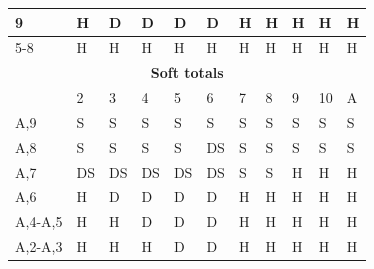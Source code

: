 \documentclass[conference]{IEEEtran}
\begin{document}
\begin{table}[ht]
\begin{tabular}{|l|l|l|l|l|l|l|l|l|l|l|}
9                            & \cellcolor{green!50}H & \cellcolor{blue!25}D & \cellcolor{blue!25}D & \cellcolor{blue!25}D & \cellcolor{blue!25}D & \cellcolor{green!50}H & \cellcolor{green!50}H & \cellcolor{green!50}H & \cellcolor{green!50}H & \cellcolor{green!50}H  \\ \hline
5-8                          & \cellcolor{green!50}H & \cellcolor{green!50}H & \cellcolor{green!50}H & \cellcolor{green!50}H & \cellcolor{green!50}H & \cellcolor{green!50}H & \cellcolor{green!50}H & \cellcolor{green!50}H & \cellcolor{green!50}H & \cellcolor{green!50}H \\ \hline \hline

\multicolumn{11}{|c|}{\textbf{Soft totals}}                           \\ \hline
                             & 2 & 3 & 4 & 5 & 6 & 7 & 8 & 9 & 10 & A \\ \hline
A,9                      & \cellcolor{red!75}S & \cellcolor{red!75}S & \cellcolor{red!75}S & \cellcolor{red!75}S & \cellcolor{red!75}S & \cellcolor{red!75}S & \cellcolor{red!75}S & \cellcolor{red!75}S & \cellcolor{red!75}S & \cellcolor{red!75}S  \\ \hline
A,8                    & \cellcolor{red!75}S & \cellcolor{red!75}S & \cellcolor{red!75}S & \cellcolor{red!75}S & \cellcolor{blue!25}DS & \cellcolor{red!75}S & \cellcolor{red!75}S & \cellcolor{red!75}S & \cellcolor{red!75}S & \cellcolor{red!75}S  \\ \hline
A,7                          & \cellcolor{blue!25}DS & \cellcolor{blue!25}DS & \cellcolor{blue!25}DS & \cellcolor{blue!25}DS & \cellcolor{blue!25}DS & \cellcolor{red!75}S & \cellcolor{red!75}S & \cellcolor{green!50}H & \cellcolor{green!50}H & \cellcolor{green!50}H  \\ \hline
A,6                          & \cellcolor{green!50}H & \cellcolor{blue!25}D & \cellcolor{blue!25}D & \cellcolor{blue!25}D & \cellcolor{blue!25}D & \cellcolor{green!50}H & \cellcolor{green!50}H & \cellcolor{green!50}H & \cellcolor{green!50}H & \cellcolor{green!50}H  \\ \hline
A,4-A,5                      & \cellcolor{green!50}H & \cellcolor{green!50}H & \cellcolor{blue!25}D & \cellcolor{blue!25}D & \cellcolor{blue!25}D & \cellcolor{green!50}H & \cellcolor{green!50}H & \cellcolor{green!50}H & \cellcolor{green!50}H & \cellcolor{green!50}H  \\ \hline
A,2-A,3                      & \cellcolor{green!50}H & \cellcolor{green!50}H & \cellcolor{green!50}H & \cellcolor{blue!25}D & \cellcolor{blue!25}D & \cellcolor{green!50}H & \cellcolor{green!50}H & \cellcolor{green!50}H & \cellcolor{green!50}H & \cellcolor{green!50}H  \\ \hline \hline


\end{tabular}
\end{table}
\end{document}
